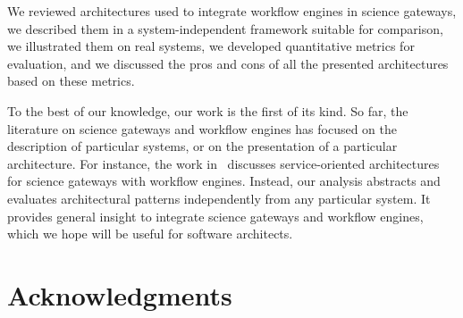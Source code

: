 \documentclass[preprint,3p,twocolumn]{elsarticle}
\newcommand{\closedanswerednote}[6]{}
\begin{document}
We reviewed architectures used to integrate workflow engines in
science gateways, we described them in a system-independent framework
suitable for comparison, we illustrated them on real systems, we
developed quantitative metrics for evaluation, and we discussed the
pros and cons of all the presented architectures based on these metrics.
\closedanswerednote{Rafael}{One thing that is missing in the
  conclusion or the limitations section is to state that this work
  does not intend to quantify the amount of work required to develop
  science gateways using a specific architecture, but the goal is to
  highlight what are the main components and interactions for each
  architecture, and the main advantages and drawbacks. This should
  also be stated in the introduction.}{Tristan}{This is in
  contradiction with the metric on 'integration effort'. What do you
  think?}{Tristan}{Fixed, as discussed in github \#8.}

To the best of our knowledge, our work is the first of its kind. So
far, the literature on science gateways and workflow engines has
focused on the description of particular systems, or on the
presentation of a particular architecture. For instance, the work
in~\cite{Gannon2005} discusses service-oriented architectures for
science gateways with workflow engines.  Instead, our analysis
abstracts and evaluates architectural patterns independently from any
particular system. It provides general insight to integrate science
gateways and workflow engines, which we hope will be useful for
software architects.


\section{Acknowledgments}
\end{document}
